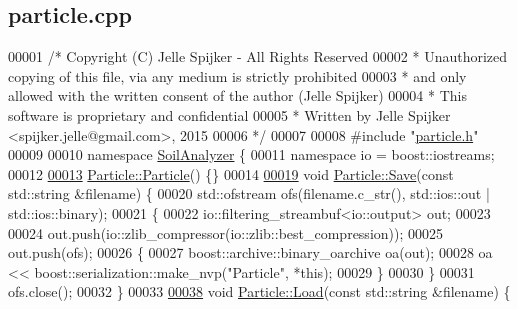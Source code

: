 \hypertarget{particle_8cpp_source}{}\subsection{particle.\+cpp}
\label{particle_8cpp_source}

\begin{DoxyCode}
00001 \textcolor{comment}{/* Copyright (C) Jelle Spijker - All Rights Reserved}
00002 \textcolor{comment}{ * Unauthorized copying of this file, via any medium is strictly prohibited}
00003 \textcolor{comment}{ * and only allowed with the written consent of the author (Jelle Spijker)}
00004 \textcolor{comment}{ * This software is proprietary and confidential}
00005 \textcolor{comment}{ * Written by Jelle Spijker <spijker.jelle@gmail.com>, 2015}
00006 \textcolor{comment}{ */}
00007 
00008 \textcolor{preprocessor}{#include "\hyperlink{particle_8h}{particle.h}"}
00009 
00010 \textcolor{keyword}{namespace }\hyperlink{namespace_soil_analyzer}{SoilAnalyzer} \{
00011 \textcolor{keyword}{namespace }io = boost::iostreams;
00012 
\hypertarget{particle_8cpp_source_l00013}{}\hyperlink{class_soil_analyzer_1_1_particle_ac01adbc5a4a30350985c0076da52e7da}{00013} \hyperlink{class_soil_analyzer_1_1_particle_ac01adbc5a4a30350985c0076da52e7da}{Particle::Particle}() \{\}
00014 
\hypertarget{particle_8cpp_source_l00019}{}\hyperlink{class_soil_analyzer_1_1_particle_a2fda22dab684cd30622dd30123b9acae}{00019} \textcolor{keywordtype}{void} \hyperlink{class_soil_analyzer_1_1_particle_a2fda22dab684cd30622dd30123b9acae}{Particle::Save}(\textcolor{keyword}{const} std::string &filename) \{
00020   std::ofstream ofs(filename.c\_str(), std::ios::out | std::ios::binary);
00021   \{
00022     io::filtering\_streambuf<io::output> out;
00023 
00024     out.push(io::zlib\_compressor(io::zlib::best\_compression));
00025     out.push(ofs);
00026     \{
00027       boost::archive::binary\_oarchive oa(out);
00028       oa << boost::serialization::make\_nvp(\textcolor{stringliteral}{"Particle"}, *\textcolor{keyword}{this});
00029     \}
00030   \}
00031   ofs.close();
00032 \}
00033 
\hypertarget{particle_8cpp_source_l00038}{}\hyperlink{class_soil_analyzer_1_1_particle_a555bb4744ce9579c4b67878b6c3d70f7}{00038} \textcolor{keywordtype}{void} \hyperlink{class_soil_analyzer_1_1_particle_a555bb4744ce9579c4b67878b6c3d70f7}{Particle::Load}(\textcolor{keyword}{const} std::string &filename) \{

\end{DoxyCode}
